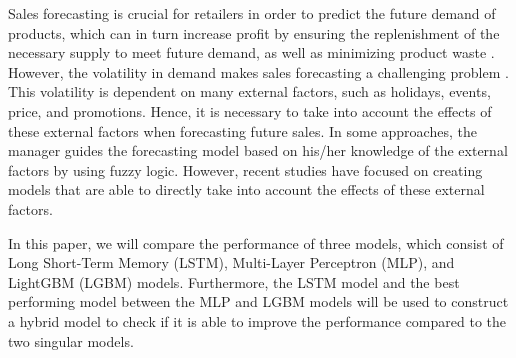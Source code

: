 Sales forecasting is crucial for retailers in order to predict the future demand of products, which can in turn increase profit by ensuring the replenishment of the necessary supply to meet future demand, as well as minimizing product waste \cite{c13}.
However, the volatility in demand makes sales forecasting a challenging problem \cite{c14}.
This volatility is dependent on many external factors, such as holidays, events, price, and promotions.
Hence, it is necessary to take into account the effects of these external factors when forecasting future sales.
In some approaches, the manager guides the forecasting model based on his/her knowledge of the external factors by using fuzzy logic.
However, recent studies have focused on creating models that are able to directly take into account the effects of these external factors.

In this paper, we will compare the performance of three models, which consist of Long Short-Term Memory (LSTM), Multi-Layer Perceptron (MLP), and LightGBM (LGBM) models.
Furthermore, the LSTM model and the best performing model between the MLP and LGBM models will be used to construct a hybrid model to check if it is able to improve the performance compared to the two singular models.
